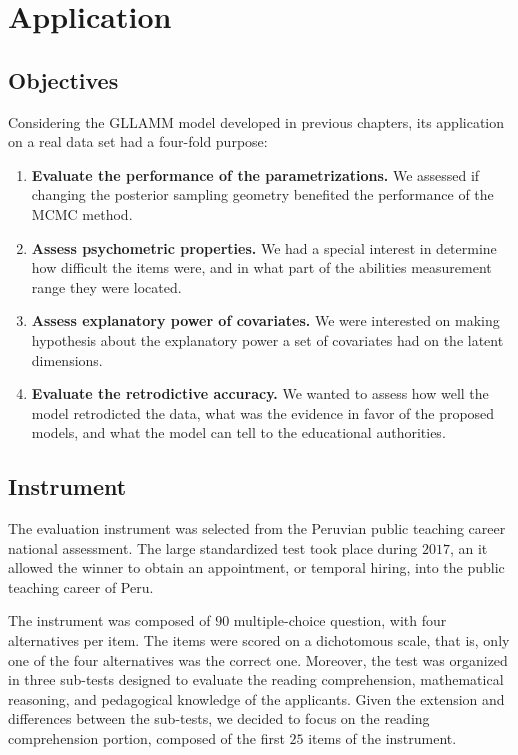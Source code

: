 \chapter{Application} \label{chap:application}

\section{Objectives}

Considering the GLLAMM model developed in previous chapters, its application on a real data set had a four-fold purpose:

\begin{enumerate}
	\item \textbf{Evaluate the performance of the parametrizations.} We assessed if changing the posterior sampling geometry benefited the performance of the MCMC method.
	\item \textbf{Assess psychometric properties.} We had a special interest in determine how difficult the items were, and in what part of the abilities measurement range they were located.
	\item \textbf{Assess explanatory power of covariates.} We were interested on making hypothesis about the explanatory power a set of covariates had on the latent dimensions. 
	\item \textbf{Evaluate the retrodictive accuracy.} We wanted to assess how well the model retrodicted the data, what was the evidence in favor of the proposed models, and what the model can tell to the educational authorities.
\end{enumerate}


\section{Instrument}

The evaluation instrument was selected from the Peruvian public teaching career national assessment. The large standardized test took place during $2017$, an it allowed the winner to obtain an appointment, or temporal hiring, into the public teaching career of Peru. 

The instrument was composed of $90$ multiple-choice question, with four alternatives per item. The items were scored on a dichotomous scale, that is, only one of the four alternatives was the correct one. Moreover, the test was organized in three sub-tests designed to evaluate the reading comprehension, mathematical reasoning, and pedagogical knowledge of the applicants. Given the extension and differences between the sub-tests, we decided to focus on the reading comprehension portion, composed of the first $25$ items of the instrument. 

